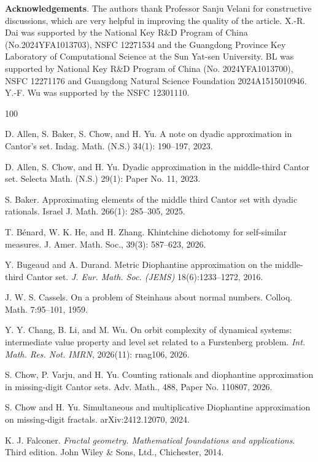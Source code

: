 \documentclass[amssymb,amsfonts,refcheck,12pt,verbatim,righttag]{amsart}
\numberwithin{equation}{section} %
\theoremstyle{plain}
\begin{document}
{\noindent \bf  Acknowledgements}. The authors thank Professor Sanju Velani for constructive discussions, which are very helpful in improving the quality of the article. X.-R. Dai was supported by the National Key R\&D Program of China (No.2024YFA1013703), NSFC 12271534 and the Guangdong Province Key Laboratory of Computational Science at the Sun Yat-sen University. BL was supported by National Key R\&D Program of
China (No. 2024YFA1013700), NSFC 12271176 and Guangdong Natural Science Foundation 2024A1515010946. Y.-F. Wu was supported by the NSFC 12301110. 
	  

\begin{thebibliography}{100}

D. Allen, S. Baker, S. Chow, and H.  Yu.
A note on dyadic approximation in Cantor's set. Indag. Math. (N.S.) 34(1): 190–197, 2023.


 D. Allen, S. Chow, and H. Yu. Dyadic approximation in the middle-third Cantor set. Selecta Math. (N.S.) 29(1): Paper No. 11, 2023.

	
S. Baker.
Approximating elements of the middle third Cantor set with dyadic rationals. 
Israel J. Math. 266(1):  285--305, 2025.

T. Bénard, W. K. He, and H. Zhang.
Khintchine dichotomy for self-similar measures. J. Amer. Math. Soc., 39(3): 587--623, 2026.



Y. Bugeaud and A. Durand.
Metric Diophantine approximation on the middle-third Cantor set.
{\em J. Eur. Math. Soc. (JEMS)} 18(6):1233--1272, 2016.


J. W. S. Cassels.
On a problem of Steinhaus about normal numbers.
Colloq. Math. 7:95–101, 1959.

Y. Y. Chang, B. Li, and M. Wu.
On orbit complexity of dynamical systems: intermediate value property and level set related to a Furstenberg problem.
{\em Int. Math. Res. Not. IMRN}, 2026(11): rnag106, 2026.

S. Chow, P. Varju, and  H. Yu.
Counting rationals and diophantine approximation in missing-digit Cantor sets. Adv. Math., 488, Paper No. 110807, 2026.

S. Chow and H. Yu. Simultaneous and multiplicative Diophantine approximation on missing-digit fractals. arXiv:2412.12070, 2024.


K. J. Falconer. {\it Fractal geometry. Mathematical foundations and applications}. Third edition.
John Wiley \& Sons, Ltd., Chichester, 2014.


\end{thebibliography}
\end{document}
